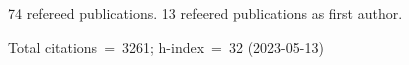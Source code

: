 74 refereed publications. 13 refeered publications as first author.

Total citations~=~3261; h-index~=~32 (2023-05-13)
